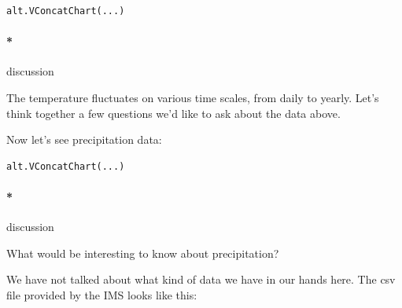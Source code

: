 \documentclass[
  letterpaper,
  DIV=11,
  numbers=noendperiod,
  oneside]{scrreprt}
\let\oldparagraph\paragraph
\renewcommand{\paragraph}[1]{\oldparagraph{#1}\mbox{}}
\begin{document}
\begin{verbatim}
alt.VConcatChart(...)
\end{verbatim}

\hypertarget{discussion}{%
\paragraph*{discussion}\label{discussion}}

The temperature fluctuates on various time scales, from daily to yearly.
Let's think together a few questions we'd like to ask about the data
above.

Now let's see precipitation data:

\begin{verbatim}
alt.VConcatChart(...)
\end{verbatim}

\hypertarget{discussion-1}{%
\paragraph*{discussion}\label{discussion-1}}

What would be interesting to know about precipitation?

We have not talked about what kind of data we have in our hands here.
The csv file provided by the IMS looks like this:
\end{document}
